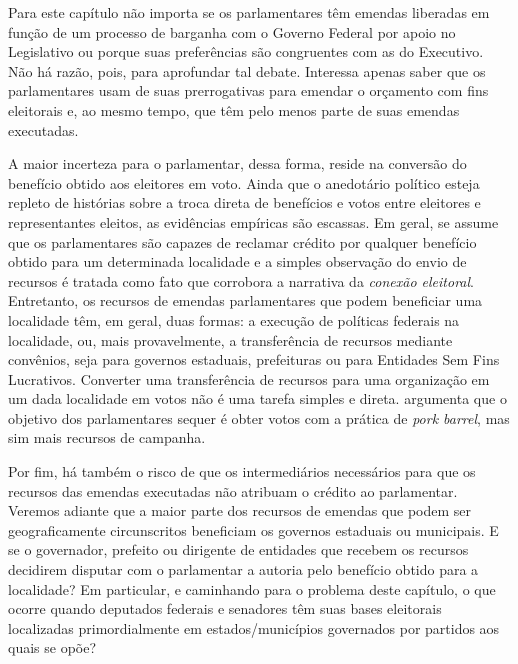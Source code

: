 Para este capítulo não importa se os parlamentares têm emendas liberadas em função de um processo de barganha com o Governo Federal por apoio no Legislativo ou porque suas preferências são congruentes com as do Executivo. Não há razão, pois, para aprofundar tal debate. Interessa apenas saber que os parlamentares usam de suas prerrogativas para emendar o orçamento com fins eleitorais e, ao mesmo tempo, que têm pelo menos parte de suas emendas executadas.

A maior incerteza para o parlamentar, dessa forma, reside na conversão do benefício obtido aos eleitores em voto. Ainda que o anedotário político esteja repleto de histórias sobre a troca direta de benefícios e votos entre eleitores e representantes eleitos, as evidências empíricas são escassas. Em geral, se assume que os parlamentares são capazes de reclamar crédito por qualquer benefício obtido para um determinada localidade e a simples observação do envio de recursos é tratada como fato que corrobora a narrativa da \emph{conexão eleitoral}. Entretanto, os recursos de emendas parlamentares que podem beneficiar uma localidade têm, em geral, duas formas: a execução de políticas federais na localidade, ou, mais provavelmente, a transferência de recursos mediante convênios, seja para governos estaduais, prefeituras ou para Entidades Sem Fins Lucrativos. Converter uma transferência de recursos para uma organização em um dada localidade em votos não é uma tarefa simples e direta. \citet{Samuels2008} argumenta que o objetivo dos parlamentares sequer é obter votos com a prática de \emph{pork barrel}, mas sim mais recursos de campanha.

Por fim, há também o risco de que os intermediários necessários para que os recursos das emendas executadas não atribuam o crédito ao parlamentar. Veremos adiante que a maior parte dos recursos de emendas que podem ser geograficamente circunscritos beneficiam os governos estaduais ou municipais. E se o governador, prefeito ou dirigente de entidades que recebem os recursos decidirem disputar com o parlamentar a autoria pelo benefício obtido para a localidade? Em particular, e caminhando para o problema deste capítulo, o que ocorre quando deputados federais e senadores têm suas bases eleitorais localizadas primordialmente em estados/municípios governados por partidos aos quais se opõe?

